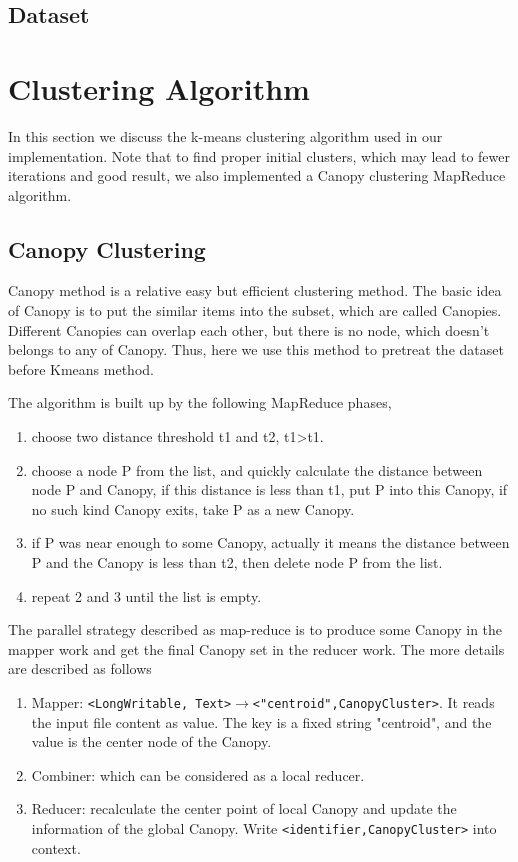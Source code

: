 \documentclass[a4paper,11pt]{article}
\begin{document}
\subsection{Dataset}

\section{Clustering Algorithm}
In this section we discuss the k-means clustering algorithm used in our
implementation. Note that to find proper initial clusters, which may lead to
fewer iterations and good result, we also implemented a Canopy clustering
MapReduce algorithm.
\subsection{Canopy Clustering}
Canopy method is a relative easy but efficient clustering method. The basic idea of Canopy is to put the similar items into the subset, which are called Canopies. Different Canopies can overlap each other, but there is no node, which doesn't belongs to any of Canopy. Thus, here we use this method to pretreat the dataset before Kmeans method.

The algorithm is built up by the following MapReduce phases,
\begin{enumerate}
  \item choose two distance threshold t1 and t2, t1>t1.	
  \item choose a node P from the list, and quickly calculate the distance between node P and Canopy, if this distance is less than t1, put P into this Canopy, if no such kind Canopy exits, take P as a new Canopy.
  \item if P was near enough to some Canopy, actually it means the distance between P and the Canopy is less than t2, then delete node P from the list.
  \item repeat 2 and 3 until the list is empty.
\end{enumerate}
The parallel strategy described as map-reduce is to produce some Canopy in the mapper work and get the final Canopy set in the reducer work. The more details are described as follows

\begin{enumerate}
    \item Mapper: \verb|<LongWritable, Text>|$\rightarrow$\verb|<"centroid",CanopyCluster>|. It reads the input file content as value. The key is a fixed string "centroid", and the value is the center node of the Canopy.
    \item Combiner: which can be considered as a local reducer.
    \item Reducer: recalculate the center point of local Canopy and update the information of the global Canopy. Write \verb|<identifier,CanopyCluster>| into context.
\end{enumerate}
\end{document}
